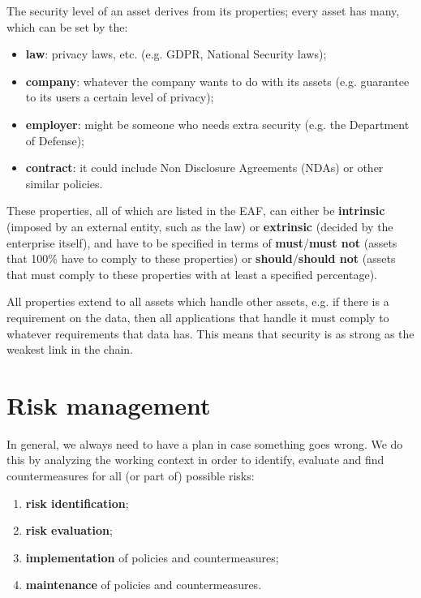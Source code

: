 The security level of an asset derives from its properties; every asset has many, which can be set by the:

\begin{itemize}
    \item \textbf{law}: privacy laws, etc. (e.g. GDPR, National Security laws);
    \item \textbf{company}: whatever the company wants to do with its assets (e.g. guarantee to its users a certain level of privacy);
    \item \textbf{employer}: might be someone who needs extra security (e.g. the Department of Defense);
    \item \textbf{contract}: it could include Non Disclosure Agreements (NDAs) or other similar policies.
\end{itemize}

These properties, all of which are listed in the EAF, can either be \textbf{intrinsic} (imposed by an external entity, such as the law) or \textbf{extrinsic} (decided by the enterprise itself), and have to be specified in terms of \textbf{must}/\textbf{must not} (assets that 100\% have to comply to these properties) or \textbf{should}/\textbf{should not} (assets that must comply to these properties with at least a specified percentage).

All properties extend to all assets which handle other assets, e.g. if there is a requirement on the data, then all applications that handle it must comply to whatever requirements that data has. This means that security is as strong as the weakest link in the chain.


\section{Risk management}
In general, we always need to have a plan in case something goes wrong. We do this by analyzing the working context in order to identify, evaluate and find countermeasures for all (or part of) possible risks:

\begin{enumerate}
    \item \textbf{risk identification};
    \item \textbf{risk evaluation};
    \item \textbf{implementation} of policies and countermeasures;
    \item \textbf{maintenance} of policies and countermeasures.
\end{enumerate}


